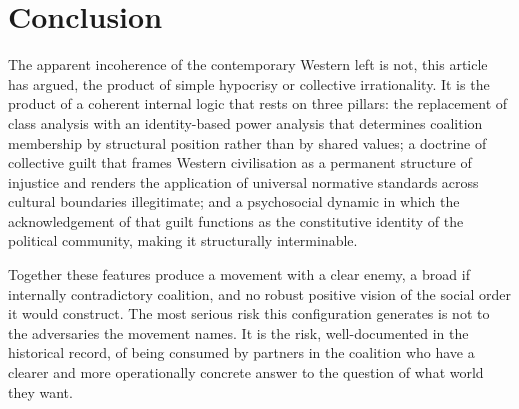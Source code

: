 \documentclass[12pt,a4paper]{article}
\begin{document}
	\section{Conclusion}
	
	The apparent incoherence of the contemporary Western left is not, this article has
	argued, the product of simple hypocrisy or collective irrationality. It is the
	product of a coherent internal logic that rests on three pillars: the replacement of
	class analysis with an identity-based power analysis that determines coalition
	membership by structural position rather than by shared values; a doctrine of
	collective guilt that frames Western civilisation as a permanent structure of
	injustice and renders the application of universal normative standards across
	cultural boundaries illegitimate; and a psychosocial dynamic in which the
	acknowledgement of that guilt functions as the constitutive identity of the
	political community, making it structurally interminable.
	
	Together these features produce a movement with a clear enemy, a broad if internally
	contradictory coalition, and no robust positive vision of the social order it would
	construct. The most serious risk this configuration generates is not to the
	adversaries the movement names. It is the risk, well-documented in the historical
	record, of being consumed by partners in the coalition who have a clearer and more
	operationally concrete answer to the question of what world they want.
	
\end{document}
